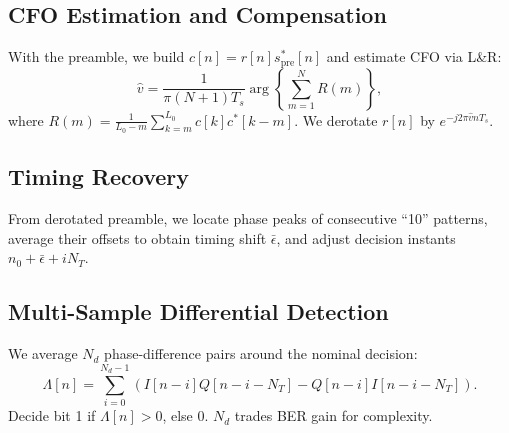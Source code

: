 \documentclass[journal]{IEEEtran}
\begin{document}
\subsection{CFO Estimation and Compensation}
With the preamble, we build $c[n]=r[n]s_{\text{pre}}^{*}[n]$ and estimate CFO via L\&R:
\begin{equation}
\hat{v}=\frac{1}{\pi (N+1)T_s}\arg\left\{\sum_{m=1}^{N}R(m)\right\},
\end{equation}
where $R(m)=\frac{1}{L_0-m}\sum_{k=m}^{L_0}c[k]c^{*}[k-m]$. We derotate $r[n]$ by $e^{-j2\pi \hat{v} nT_s}$.

\subsection{Timing Recovery}
From derotated preamble, we locate phase peaks of consecutive ``10'' patterns, average their offsets to obtain timing shift $\bar{\epsilon}$, and adjust decision instants $n_0+\bar{\epsilon}+iN_T$.

\subsection{Multi-Sample Differential Detection}
We average $N_d$ phase-difference pairs around the nominal decision:
\begin{equation}
\Lambda[n]=\sum_{i=0}^{N_d-1}\left(I[n-i]Q[n-i-N_T]-Q[n-i]I[n-i-N_T]\right).
\end{equation}
Decide bit 1 if $\Lambda[n]>0$, else 0. $N_d$ trades BER gain for complexity.
\end{document}
